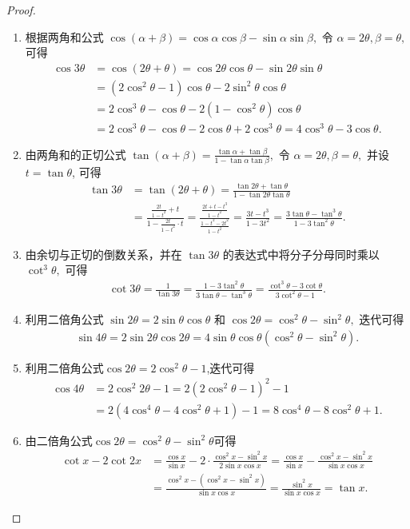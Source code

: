 \documentclass[../../main.tex]{subfiles}%
\begin{document}
\begin{proof}
\begin{enumerate}[(1)]
\item 根据两角和公式 \(\cos(\alpha+\beta) = \cos\alpha\cos\beta - \sin\alpha\sin\beta,\) 令 $\alpha=2\theta, \beta=\theta,$ 可得
\begin{align*}
\cos 3\theta &= \cos(2\theta+\theta) = \cos 2\theta\cos\theta - \sin 2\theta\sin\theta \\
&= (2\cos^2\theta - 1)\cos\theta - 2\sin^2\theta\cos\theta \\
&= 2\cos^3\theta - \cos\theta - 2(1-\cos^2\theta)\cos\theta \\
&= 2\cos^3\theta - \cos\theta - 2\cos\theta + 2\cos^3\theta = 4\cos^3\theta - 3\cos\theta.
\end{align*}
\item 由两角和的正切公式 \(\tan(\alpha+\beta) = \frac{\tan\alpha + \tan\beta}{1-\tan\alpha\tan\beta},\) 令 $\alpha = 2\theta, \beta = \theta,$ 并设 \(t = \tan\theta\), 可得
\begin{align*}
\tan 3\theta &= \tan(2\theta+\theta) = \frac{\tan 2\theta + \tan\theta}{1 - \tan 2\theta\tan\theta} \\
&= \frac{\frac{2t}{1-t^2} + t}{1 - \frac{2t}{1-t^2} \cdot t} = \frac{\frac{2t+t-t^3}{1-t^2}}{\frac{1-t^2-2t^2}{1-t^2}} = \frac{3t - t^3}{1 - 3t^2} = \frac{3\tan\theta - \tan^3\theta}{1 - 3\tan^2\theta}.
\end{align*}
\item 由余切与正切的倒数关系，并在 $\tan 3\theta$ 的表达式中将分子分母同时乘以 $\cot^3\theta,$ 可得
\begin{align*}
\cot 3\theta = \frac{1}{\tan 3\theta} = \frac{1 - 3\tan^2\theta}{3\tan\theta - \tan^3\theta} = \frac{\cot^3\theta - 3\cot\theta}{3\cot^2\theta - 1}.
\end{align*}
\item 利用二倍角公式 $\sin 2\theta = 2\sin\theta\cos\theta$ 和 $\cos 2\theta = \cos^2\theta-\sin^2\theta,$ 迭代可得
\begin{align*}
\sin 4\theta = 2\sin 2\theta\cos 2\theta = 4\sin\theta\cos\theta(\cos^2\theta - \sin^2\theta).
\end{align*}
\item 利用二倍角公式\(\cos 2\theta =2\cos^2\theta - 1\),迭代可得
\begin{align*}
\cos 4\theta &= 2\cos^2 2\theta - 1 = 2(2\cos^2\theta - 1)^2 - 1 \\
&= 2(4\cos^4\theta - 4\cos^2\theta + 1) - 1 = 8\cos^4\theta - 8\cos^2\theta + 1.
\end{align*}
\item 由二倍角公式\(\cos 2\theta = \cos^2\theta - \sin^2\theta\)可得
\begin{align*}
\cot x - 2\cot 2x &= \frac{\cos x}{\sin x} - 2 \cdot \frac{\cos^2 x - \sin^2 x}{2\sin x\cos x} = \frac{\cos x}{\sin x} - \frac{\cos^2 x - \sin^2 x}{\sin x\cos x} \\
&= \frac{\cos^2 x - (\cos^2 x - \sin^2 x)}{\sin x\cos x} = \frac{\sin^2 x}{\sin x\cos x} = \tan x.
\end{align*}
\end{enumerate}
\end{proof}
\end{document}
